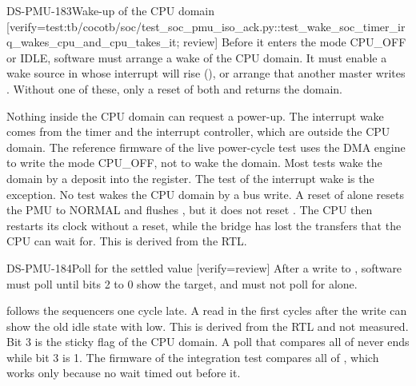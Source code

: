 \begin{requirement}{DS-PMU-183}{Wake-up of the CPU domain}
[verify={test:tb/cocotb/soc/test_soc_pmu_iso_ack.py::test_wake_soc_timer_irq_wakes_cpu_and_cpu_takes_it; review}]
Before it enters the mode CPU\_OFF or IDLE, software must arrange a wake of the CPU domain. It must enable a wake source in  whose interrupt will rise (), or arrange that another master writes . Without one of these, only a reset of both  and  returns the domain.
\end{requirement}
\begin{information}
Nothing inside the CPU domain can request a power-up. The interrupt wake comes from the timer and the interrupt controller, which are outside the CPU domain. The reference firmware of the live power-cycle test uses the DMA engine to write the mode CPU\_OFF, not to wake the domain. Most tests wake the domain by a deposit into the register. The test of the interrupt wake is the exception. No test wakes the CPU domain by a bus write. A reset of  alone resets the PMU to NORMAL and flushes , but it does not reset . The CPU then restarts its clock without a reset, while the bridge has lost the transfers that the CPU can wait for. This is derived from the RTL.
\end{information}

\begin{requirement}{DS-PMU-184}{Poll for the settled value}
[verify={review}]
After a write to , software must poll  until bits 2 to 0 show the target, and must not poll for  alone.
\end{requirement}
\begin{information}
 follows the sequencers one cycle late. A read in the first cycles after the write can show the old idle state with  low. This is derived from the RTL and not measured. Bit 3 is the sticky flag of the CPU domain. A poll that compares all of  never ends while bit 3 is 1. The firmware of the integration test compares all of , which works only because no wait timed out before it.
\end{information}

